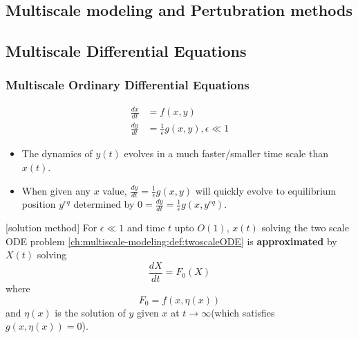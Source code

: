 
\begin{refsection}
	\startcontents[chapters]	
	
\chapter{Multiscale modeling and Pertubration methods}\label{ch:multiscale-modeling}

\section{Multiscale Differential Equations}
\subsection{Multiscale Ordinary Differential Equations}
\begin{definition}\cite[128]{pavliotis2008multiscale}\label{ch:multiscale-modeling:def:twoscaleODE}
\begin{align*}
	\frac{d x}{d t} &= f(x,y)\\
\frac{d y}{d t} &= \frac{1}{\epsilon}g(x,y),\epsilon \ll 1
\end{align*}
\end{definition}

\begin{remark}[implications]
\begin{itemize}
	\item The dynamics of $y(t)$ evolves in a much faster/smaller time scale than $x(t)$.
	\item When given any $x$ value, $\frac{d y}{d t} = \frac{1}{\epsilon}g(x,y)$ will quickly evolve to equilibrium position $y^{eq}$ determined by
	$0 = \frac{d y}{d t} = \frac{1}{\epsilon}g(x,y^{eq}).$ 
\end{itemize}
\end{remark}


\begin{theorem}\cite[128]{pavliotis2008multiscale}\label{ch:multiscale-modeling:th:largetimescalesolutionformultiscaleODE}[solution method]
For $\epsilon \ll 1$ and time $t$ upto $O(1)$, $x(t)$ solving the two scale ODE problem \autoref{ch:multiscale-modeling:def:twoscaleODE} is \textbf{approximated} by $X(t)$ solving
$$\frac{dX}{dt} = F_0(X)$$
where
$$F_0 = f(x,\eta(x))$$
and $\eta(x)$ is the solution of $y$ given $x$ at $t\to \infty$(which satisfies $g(x,\eta(x)) = 0$).
\end{theorem}



\end{refsection}
